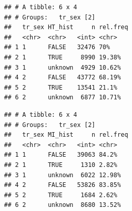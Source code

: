 \documentclass[]{article}
\newenvironment{Shaded}{\begin{snugshade}}{\end{snugshade}}
\newcommand{\DataTypeTok}[1]{\textcolor[rgb]{0.13,0.29,0.53}{#1}}
\newcommand{\DecValTok}[1]{\textcolor[rgb]{0.00,0.00,0.81}{#1}}
\newcommand{\KeywordTok}[1]{\textcolor[rgb]{0.13,0.29,0.53}{\textbf{#1}}}
\newcommand{\NormalTok}[1]{#1}
\newcommand{\OperatorTok}[1]{\textcolor[rgb]{0.81,0.36,0.00}{\textbf{#1}}}
\newcommand{\OtherTok}[1]{\textcolor[rgb]{0.56,0.35,0.01}{#1}}
\newcommand{\StringTok}[1]{\textcolor[rgb]{0.31,0.60,0.02}{#1}}
\begin{document}
\begin{verbatim}
## # A tibble: 6 x 4
## # Groups:   tr_sex [2]
##   tr_sex HT_hist     n rel.freq
##   <chr>  <chr>   <int> <chr>   
## 1 1      FALSE   32476 70%     
## 2 1      TRUE     8990 19.38%  
## 3 1      unknown  4929 10.62%  
## 4 2      FALSE   43772 68.19%  
## 5 2      TRUE    13541 21.1%   
## 6 2      unknown  6877 10.71%
\end{verbatim}

\begin{Shaded}
\end{Shaded}

\begin{verbatim}
## # A tibble: 6 x 4
## # Groups:   tr_sex [2]
##   tr_sex MI_hist     n rel.freq
##   <chr>  <chr>   <int> <chr>   
## 1 1      FALSE   39063 84.2%   
## 2 1      TRUE     1310 2.82%   
## 3 1      unknown  6022 12.98%  
## 4 2      FALSE   53826 83.85%  
## 5 2      TRUE     1684 2.62%   
## 6 2      unknown  8680 13.52%
\end{verbatim}

\begin{Shaded}
\end{Shaded}
\end{document}

